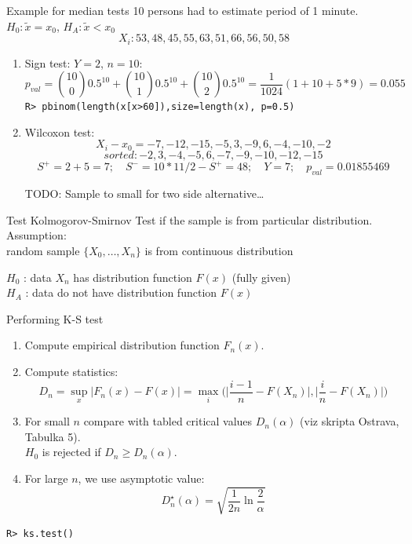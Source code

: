 \documentclass[smaller]{beamer}
\def\abs#1{\lvert#1\rvert}
\def\blue#1{{\usebeamercolor[fg]{my blue} #1}}
\def\xskip{{\vspace{2ex}}}
\begin{document}
\begin{frame}[fragile]{Example for median tests}
10 persons had to estimate period of 1 minute. $H_0: \tilde{x} = x_0$, $H_A: \tilde{x} < x_0$
\[
 X_i: 53, 48, 45, 55, 63, 51, 66, 56, 50, 58
\]

\begin{enumerate}
  \item Sign test: $Y = 2$, $n=10$:
  \[
    p_{val}= \binom{10}{0} 0.5^{10} +\binom{10}{1} 0.5^{10}+\binom{10}{2} 0.5^{10}=\frac{1}{1024} ( 1 + 10 + 5*9) = 0.055   
  \]
  \verb'R> pbinom(length(x[x>60]),size=length(x), p=0.5)'
%
  \item Wilcoxon test: 
   \[
      X_i-x_0 = -7, -12, -15, -5, 3, -9, 6, -4, -10, -2 
   \]
   \[
      sorted: -2, 3, -4, -5, 6, -7, -9, -10, -12, -15    
   \]
   \[ 
      S^+= 2 + 5 =7;\quad S^- =10*11/2-S^+ = 48;\quad Y=7;\quad p_{val}=0.01855469
   \]

   
    TODO: Sample to small for two side alternative\dots
\end{enumerate}

\end{frame}


\begin{frame}{Test Kolmogorov-Smirnov}
Test if the sample is from particular distribution.\\

\xskip
\blue{Assumption:}\\
random sample $\{X_0,\dots,X_n\}$ is from continuous distribution

\xskip
  $H_0$ : data $X_n$ has distribution function $F(x)$ (fully given)\\
  $H_A$ : data do not have distribution function $F(x)$
\end{frame}

\begin{frame}[fragile]{Performing K-S test}
  \begin{enumerate}
   \item Compute empirical distribution function $F_n(x)$.
   \item Compute statistics:
   \[
      D_n = \sup_{x} \abs{F_n(x) - F(x)} = \max_{i} \big( \abs{ \frac{i-1}{n} - F(X_n)}, \abs{\frac{i}{n} - F(X_n)} \big)
   \]
   \item For small $n$ compare with tabled critical values $D_n(\alpha)$ (viz skripta Ostrava, Tabulka 5).\\
         $H_0$ is rejected if $D_n \ge D_n(\alpha)$.
   \item For large $n$, we use asymptotic value:
         \[
            D_n^{\star}(\alpha) = \sqrt{\frac{1}{2n} \ln\frac{2}{\alpha}}
         \]
  \end{enumerate}
   \verb'R> ks.test()'
\end{frame}
\end{document}
